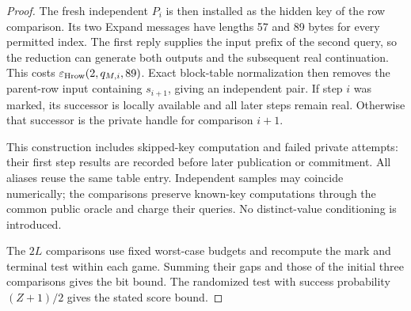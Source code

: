\begin{proof}
The fresh independent $P_i$ is then installed as the hidden key of
the row comparison. Its two Expand messages have lengths 57 and 89
bytes for every permitted index. The first reply supplies the input
prefix of the second query, so the reduction can generate both outputs
and the subsequent real continuation. This costs
$\varepsilon_{\rm Hrow}(2,q_{M,i},89)$. Exact block-table normalization
then removes the parent-row input containing $s_{i+1}$, giving an
independent pair. If step $i$ was marked, its successor is locally
available and all later steps remain real. Otherwise that successor
is the private handle for comparison $i+1$.

This construction includes skipped-key computation and failed private
attempts: their first step results are recorded before later publication
or commitment. All aliases reuse the same table entry. Independent
samples may coincide numerically; the comparisons preserve known-key
computations through the common public oracle and charge their queries.
No distinct-value conditioning is introduced.

The $2L$ comparisons use fixed worst-case budgets and recompute the
mark and terminal test within each game. Summing their gaps and those of
the initial three comparisons gives the bit bound.
The randomized test with success probability $(Z+1)/2$ gives the
stated score bound.
\end{proof}

